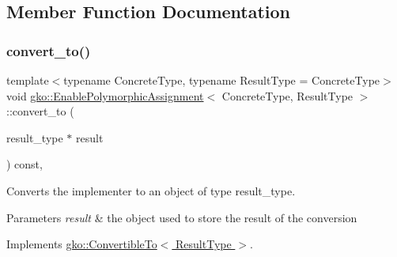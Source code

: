 \subsection{Member Function Documentation}
\mbox{\label{classgko_1_1EnablePolymorphicAssignment_a6b7e6872e96084636f8ab5091063ada8}} 
\subsubsection{\texorpdfstring{convert\+\_\+to()}{convert\_to()}}
{\footnotesize\ttfamily template$<$typename Concrete\+Type, typename Result\+Type = Concrete\+Type$>$ \\
void \hyperlink{classgko_1_1EnablePolymorphicAssignment}{gko\+::\+Enable\+Polymorphic\+Assignment}$<$ Concrete\+Type, Result\+Type $>$\+::convert\+\_\+to (\begin{DoxyParamCaption}\item[{result\+\_\+type $\ast$}]{result }\end{DoxyParamCaption}) const\hspace{0.3cm}{\ttfamily [override]}, {\ttfamily [virtual]}}



Converts the implementer to an object of type result\+\_\+type. 


\begin{DoxyParams}{Parameters}
{\em result} & the object used to store the result of the conversion \\
\hline
\end{DoxyParams}


Implements \hyperlink{classgko_1_1ConvertibleTo_aa7f3420babcbed39ee15bc020bed4f7e}{gko\+::\+Convertible\+To$<$ Result\+Type $>$}.

\mbox{\label{classgko_1_1EnablePolymorphicAssignment_a0a4cf244139e7761d6a91c61e029810e}} 
